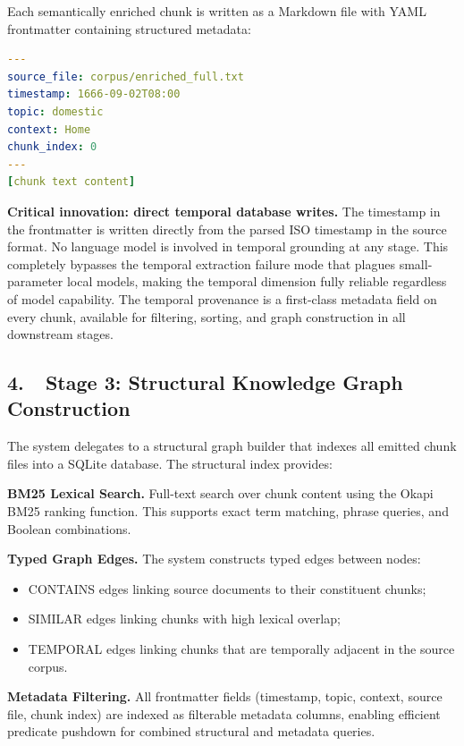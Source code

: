 \documentclass[12pt,letterpaper]{article}
\begin{document}
Each semantically enriched chunk is written as a Markdown file with YAML frontmatter
containing structured metadata:

\begin{lstlisting}[language=YAML, caption={Emitted chunk document with YAML frontmatter}]
---
source_file: corpus/enriched_full.txt
timestamp: 1666-09-02T08:00
topic: domestic
context: Home
chunk_index: 0
---
[chunk text content]
\end{lstlisting}

\textbf{Critical innovation: direct temporal database writes.} The timestamp in the
frontmatter is written directly from the parsed ISO timestamp in the source format. No
language model is involved in temporal grounding at any stage. This completely bypasses
the temporal extraction failure mode that plagues small-parameter local models, making
the temporal dimension fully reliable regardless of model capability. The temporal
provenance is a first-class metadata field on every chunk, available for filtering,
sorting, and graph construction in all downstream stages.

\subsection*{4.\ \ Stage 3: Structural Knowledge Graph Construction}

The system delegates to a structural graph builder that indexes all emitted chunk files
into a SQLite database. The structural index provides:

\textbf{BM25 Lexical Search.} Full-text search over chunk content using the Okapi BM25
ranking function. This supports exact term matching, phrase queries, and Boolean
combinations.

\textbf{Typed Graph Edges.} The system constructs typed edges between nodes:

\begin{itemize}[leftmargin=2cm, itemsep=3pt]
  \item CONTAINS edges linking source documents to their constituent chunks;
  \item SIMILAR edges linking chunks with high lexical overlap;
  \item TEMPORAL edges linking chunks that are temporally adjacent in the source corpus.
\end{itemize}

\textbf{Metadata Filtering.} All frontmatter fields (timestamp, topic, context, source
file, chunk index) are indexed as filterable metadata columns, enabling efficient
predicate pushdown for combined structural and metadata queries.
\end{document}
